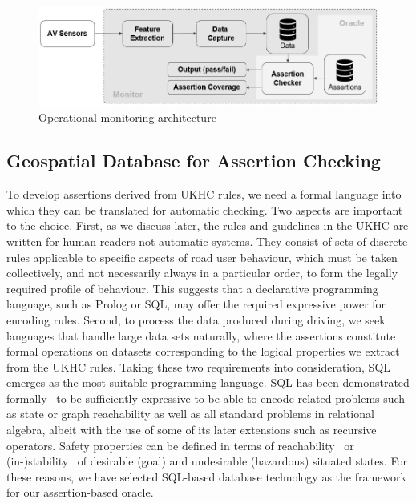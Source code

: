  
\begin{figure}[h!]
    \centering
    \includegraphics[width=0.98\linewidth]{../other/figures/RuntimeAssertionsTestBenchArchitecture.jpg}
    \caption{Operational monitoring architecture}
    \label{fig:RuntimeArchitecture}
\end{figure}


\subsection{Geospatial Database for Assertion Checking} \label{geospatial_database}
To develop assertions derived from UKHC rules, we need a formal language into which they can be translated for automatic checking. Two aspects are important to the choice. First, as we discuss later, the rules and guidelines in the UKHC are written for human readers not automatic systems. They consist of sets of discrete rules applicable to specific aspects of road user behaviour, which must be taken collectively, and not necessarily always in a particular order, to form the legally required profile of behaviour. This suggests that a declarative programming language, such as Prolog or SQL, may offer the required expressive power for encoding rules.
%
Second, to process the data produced during driving, we seek languages that handle large data sets naturally, where the assertions constitute formal operations on datasets corresponding to the logical properties we extract from the UKHC rules. 
%
Taking these two requirements into consideration, SQL emerges as the most suitable programming language. SQL has been demonstrated formally~\cite{sqllibkin} to be sufficiently expressive to be able to encode related problems such as state or graph reachability as well as all standard problems in relational algebra, albeit with the use of some of its later extensions such as recursive operators. Safety properties can be defined in terms of reachability~\cite{guiochet2015, masson2019} or (in-)stability~\cite{harper2005, xue2020} of desirable (goal) and undesirable (hazardous) situated states. For these reasons, we have selected SQL-based database technology as the framework for our assertion-based oracle. 

